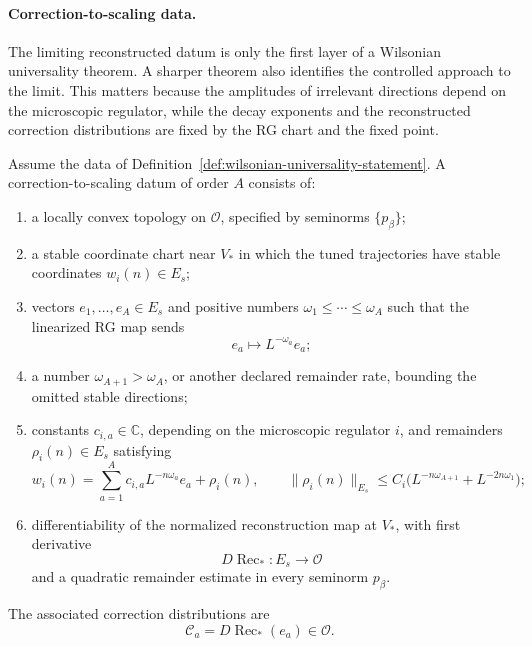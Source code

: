 \paragraph{Correction-to-scaling data.}
The limiting reconstructed datum is only the first layer of a Wilsonian
universality theorem.  A sharper theorem also identifies the controlled
approach to the limit.  This matters because the amplitudes of irrelevant
directions depend on the microscopic regulator, while the decay exponents and
the reconstructed correction distributions are fixed by the RG chart and the
fixed point.

\begin{definition}
\label{def:correction-to-scaling-datum}
Assume the data of
Definition~\ref{def:wilsonian-universality-statement}.  A
correction-to-scaling datum of order \(A\) consists of:
\begin{enumerate}
\item a locally convex topology on \(\mathcal O\), specified by seminorms
\(\{p_\beta\}\);
\item a stable coordinate chart near \(V_\ast\) in which the tuned
trajectories have stable coordinates \(w_i(n)\in E_s\);
\item vectors \(e_1,\ldots,e_A\in E_s\) and positive numbers
\(\omega_1\le\cdots\le\omega_A\) such that the linearized RG map sends
\[
  e_a\longmapsto L^{-\omega_a}e_a ;
\]
\item a number \(\omega_{A+1}>\omega_A\), or another declared remainder
rate, bounding the omitted stable directions;
\item constants \(c_{i,a}\in\mathbb C\), depending on the microscopic
regulator \(i\), and remainders \(\rho_i(n)\in E_s\) satisfying
\begin{equation}
  w_i(n)
  =
  \sum_{a=1}^{A}c_{i,a}L^{-n\omega_a}e_a+\rho_i(n),
  \qquad
  \|\rho_i(n)\|_{E_s}
  \le
  C_i\bigl(L^{-n\omega_{A+1}}+L^{-2n\omega_1}\bigr);
  \label{eq:correction-stable-coordinate-expansion}
\end{equation}
\item differentiability of the normalized reconstruction map at \(V_\ast\),
with first derivative
\[
  D\operatorname{Rec}_{\ast}:E_s\longrightarrow\mathcal O
\]
and a quadratic remainder estimate in every seminorm \(p_\beta\).
\end{enumerate}
The associated correction distributions are
\[
  \mathcal C_a=D\operatorname{Rec}_{\ast}(e_a)\in\mathcal O .
\]
\end{definition}

